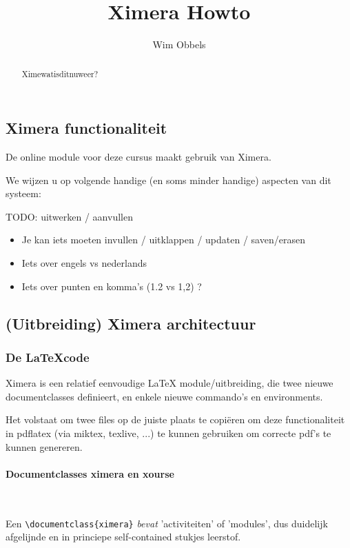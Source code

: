\documentclass{ximera}
\author{Wim Obbels}
\title{Ximera Howto}
\begin{document}
\begin{abstract}
	Ximewatisditnuweer?
\end{abstract}
\maketitle

\subsection{Ximera functionaliteit}
De online module voor deze cursus maakt gebruik van Ximera.

We wijzen u op volgende handige (en soms minder handige) aspecten van dit systeem:


TODO: uitwerken / aanvullen


\begin{itemize}
	\item Je kan iets moeten invullen / uitklappen / updaten / saven/erasen

	\item Iets over engels vs nederlands

	\item Iets over punten en komma's  (1.2 vs 1,2) ?

\end{itemize}

\subsection{(Uitbreiding) Ximera architectuur}

\subsubsection{De \LaTeX code}

Ximera is een relatief eenvoudige LaTeX module/uitbreiding, die twee nieuwe documentclasses definieert, en enkele nieuwe commando's en environments.

Het volstaat om twee files op de juiste plaats te copiëren om deze functionaliteit in pdflatex (via miktex, texlive, ...)  te kunnen gebruiken om correcte pdf's te kunnen genereren.


\paragraph{Documentclasses ximera en xourse} \ 

Een \verb|\documentclass{ximera}| \textit{bevat} 'activiteiten' of 'modules', dus duidelijk afgelijnde en in princiepe self-contained stukjes leerstof. 
\end{document}
